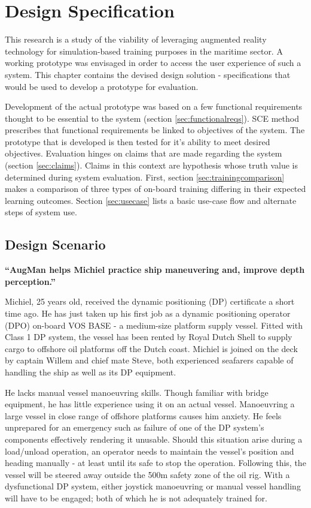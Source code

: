 \chapter{Design Specification}
\label{chap:specification}
This research is a study of the viability of leveraging augmented reality technology for simulation-based training purposes in the maritime sector. A working prototype was envisaged in order to access the user experience of such a system. This chapter contains the devised design solution - specifications that would be used to develop a prototype for evaluation. 


Development of the actual prototype was based on a few functional requirements thought to be essential to the system (section \ref{sec:functionalreqs}). SCE method prescribes that functional requirements be linked to objectives of the system. The prototype that is developed is then tested for it's ability to meet desired objectives. Evaluation hinges on claims that are made regarding the system (section \ref{sec:claims}). Claims in this context are hypothesis whose truth value is determined during system evaluation. First, section \ref{sec:trainingcomparison} makes a comparison of three types of on-board training differing in their expected learning outcomes. Section \ref{sec:usecase} lists a basic use-case flow and alternate steps of system use.




\section{Design Scenario}

\textbf{“AugMan helps Michiel practice ship maneuvering and, improve depth perception.”}

Michiel, 25 years old, received the dynamic positioning (DP) certificate a short time ago. He has just taken up his first job as a dynamic positioning operator (DPO) on-board VOS BASE - a medium-size platform supply vessel. Fitted with Class 1 DP system, the vessel has been rented by Royal Dutch Shell to supply cargo to offshore oil platforms off the Dutch coast. Michiel is joined on the deck by captain Willem and chief mate Steve, both experienced seafarers capable of handling the ship as well as its DP equipment.

He lacks manual vessel manoeuvring skills. Though familiar with bridge equipment, he has little experience using it on an actual vessel. Manoeuvring a large vessel in close range of offshore platforms causes him anxiety. He feels unprepared for an emergency such as failure of one of the DP system's components effectively rendering it unusable. Should this situation arise during a load/unload operation, an operator needs to maintain the vessel's position and heading manually - at least until its safe to stop the operation. Following this, the vessel will be steered away outside the 500m safety zone of the oil rig. With a dysfunctional DP system, either joystick manoeuvring or manual vessel handling will have to be engaged; both of which he is not adequately trained for. 

